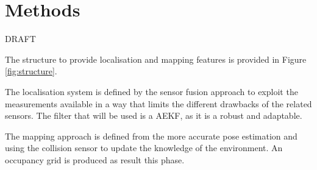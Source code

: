 \chapter{Methods}
\label{ch:methods}

DRAFT

\noindent The structure to provide localisation and mapping features is provided in Figure \ref{fig:structure}.

The localisation system is defined by the sensor fusion approach to exploit the measurements available in a way that limits the different drawbacks of the related sensors.
The filter that will be used is a \gls{AEKF}, as it is a robust and adaptable.

The mapping approach is defined from the more accurate pose estimation and using the collision sensor to update the knowledge of the environment.
An occupancy grid is produced as result this phase.

